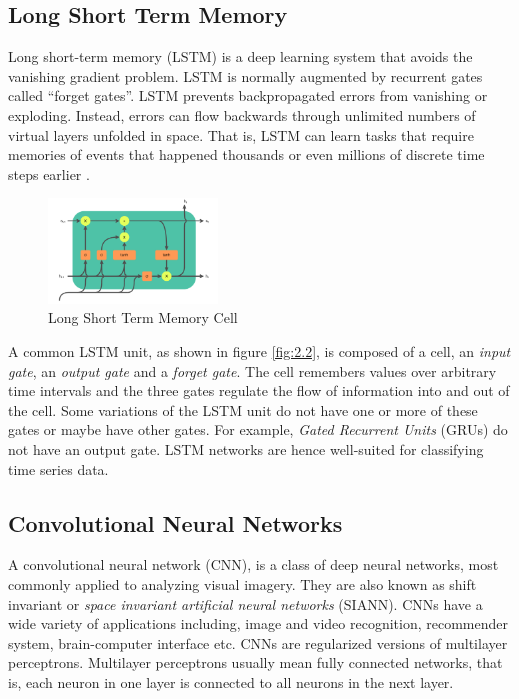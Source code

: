 \documentclass[twocolumn, switch]{article} %
\begin{document}
\subsection{Long Short Term Memory}
\label{sub:sec:lstm}

Long short-term memory (LSTM) is a deep learning system that avoids the vanishing gradient problem. LSTM is normally augmented by recurrent gates called ``forget gates''. LSTM prevents backpropagated errors from vanishing or exploding. Instead, errors can flow backwards through unlimited numbers of virtual layers unfolded in space. That is, LSTM can learn tasks that require memories of events that happened thousands or even millions of discrete time steps earlier \cite{wiki:rnns}.

\begin{figure}[!htbp]
    \centering
    \includegraphics[width=0.4\textwidth]{LSTM_cell.png}
    \caption[Long Short Term Memory Cell]{Long Short Term Memory Cell \cite{wiki:lstm}}
    \label{fig:2.2}
\end{figure}

A common LSTM unit, as shown in figure \eqref{fig:2.2}, is composed of a cell, an \emph{input gate}, an \emph{output gate} and a \emph{forget gate}. The cell remembers values over arbitrary time intervals and the three gates regulate the flow of information into and out of the cell. Some variations of the LSTM unit do not have one or more of these gates or maybe have other gates. For example, \emph{Gated Recurrent Units} (GRUs) do not have an output gate. LSTM networks are hence well-suited for classifying time series data.

\subsection{Convolutional Neural Networks}
\label{sub:sec:cnnlr}

A convolutional neural network (CNN), is a class of deep neural networks, most commonly applied to analyzing visual imagery. They are also known as shift invariant or \emph{space invariant artificial neural networks} (SIANN). CNNs have a wide variety of applications including, image and video recognition, recommender system, brain-computer interface etc. CNNs are regularized versions of multilayer perceptrons. Multilayer perceptrons usually mean fully connected networks, that is, each neuron in one layer is connected to all neurons in the next layer.
\end{document}
